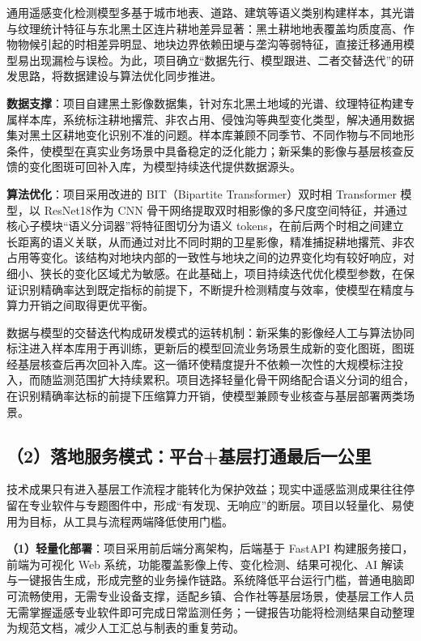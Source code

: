 \documentclass[12pt, a4paper]{ctexart}
\begin{document}
通用遥感变化检测模型多基于城市地表、道路、建筑等语义类别构建样本，其光谱与纹理统计特征与东北黑土区连片耕地差异显著：黑土耕地地表覆盖均质度高、作物物候引起的时相差异明显、地块边界依赖田埂与垄沟等弱特征，直接迁移通用模型易出现漏检与误检。为此，项目确立“数据先行、模型跟进、二者交替迭代”的研发思路，将数据建设与算法优化同步推进。

\textbf{数据支撑}：项目自建黑土影像数据集，针对东北黑土地域的光谱、纹理特征构建专属样本库，系统标注耕地撂荒、非农占用、侵蚀沟等典型变化类型，解决通用数据集对黑土区耕地变化识别不准的问题。样本库兼顾不同季节、不同作物与不同地形条件，使模型在真实业务场景中具备稳定的泛化能力；新采集的影像与基层核查反馈的变化图斑可回补入库，为模型持续迭代提供数据源头。

\textbf{算法优化}：项目采用改进的 BIT（Bipartite Transformer）双时相 Transformer 模型，以 ResNet18作为 CNN 骨干网络提取双时相影像的多尺度空间特征，并通过核心子模块“语义分词器”将特征图切分为语义 tokens，在前后两个时相之间建立长距离的语义关联，从而通过对比不同时期的卫星影像，精准捕捉耕地撂荒、非农占用等变化。该结构对地块内部的一致性与地块之间的边界变化均有较好响应，对细小、狭长的变化区域尤为敏感。在此基础上，项目持续迭代优化模型参数，在保证识别精确率达到既定指标的前提下，不断提升检测精度与效率，使模型在精度与算力开销之间取得更优平衡。

数据与模型的交替迭代构成研发模式的运转机制：新采集的影像经人工与算法协同标注进入样本库用于再训练，更新后的模型回流业务场景生成新的变化图斑，图斑经基层核查后再次回补入库。这一循环使精度提升不依赖一次性的大规模标注投入，而随监测范围扩大持续累积。项目选择轻量化骨干网络配合语义分词的组合，在识别精确率达标的前提下压缩算力开销，使模型兼顾专业核查与基层部署两类场景。

\subsection{（2）落地服务模式：平台+基层打通最后一公里}

技术成果只有进入基层工作流程才能转化为保护效益；现实中遥感监测成果往往停留在专业软件与专题图件中，形成“有发现、无响应”的断层。项目以轻量化、易使用为目标，从工具与流程两端降低使用门槛。

\textbf{（1）轻量化部署}：项目采用前后端分离架构，后端基于 FastAPI 构建服务接口，前端为可视化 Web 系统，功能覆盖影像上传、变化检测、结果可视化、AI 解读与一键报告生成，形成完整的业务操作链路。系统降低平台运行门槛，普通电脑即可流畅使用，无需专业设备支撑，适配乡镇、合作社等基层场景，使基层工作人员无需掌握遥感专业软件即可完成日常监测任务；一键报告功能将检测结果自动整理为规范文档，减少人工汇总与制表的重复劳动。
\end{document}
